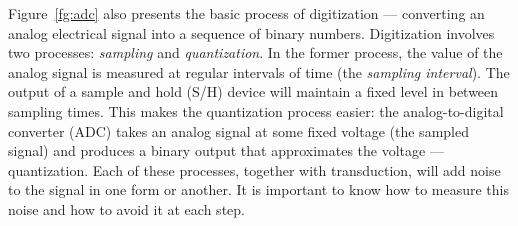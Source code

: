 Figure~\ref{fg:adc} also presents the basic process of digitization
--- converting an analog electrical signal into a sequence of binary
numbers.  Digitization involves two processes: \emph{sampling} and
\emph{quantization}.  In the former process, the value of the analog
signal is measured at regular intervals of time (the \emph{sampling
interval}). The output of a sample and hold (S/H) device will
maintain a fixed level in between sampling times. This makes the
quantization process easier: the analog-to-digital converter (ADC)
takes an analog signal at some fixed voltage (the sampled signal) and
produces a binary output that approximates the voltage ---
quantization. Each of these processes, together with transduction, will add noise to the signal in one form or another. It is important to know how to measure this noise and how to avoid it at each step. 


